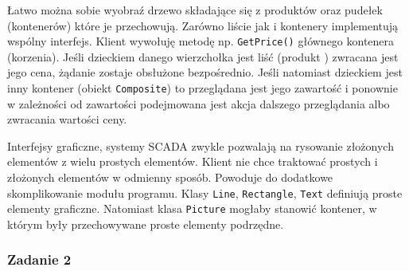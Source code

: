 Łatwo można sobie wyobraź drzewo składające się z produktów oraz pudełek (kontenerów) które je przechowują. Zarówno liście jak i kontenery implementują wspólny interfejs. Klient wywołuję metodę np. \texttt{GetPrice()} głównego kontenera (korzenia). Jeśli dzieckiem danego wierzchołka jest liść (produkt ) zwracana jest jego cena, żądanie zostaje obsłużone bezpośrednio. Jeśli natomiast dzieckiem jest inny kontener (obiekt \texttt{Composite}) to przeglądana jest jego zawartość i ponownie w zależności od zawartości podejmowana jest akcja dalszego przeglądania albo zwracania wartości ceny.

Interfejsy graficzne, systemy SCADA zwykle pozwalają na rysowanie złożonych elementów z wielu prostych elementów. Klient nie chce traktować prostych i złożonych elementów w odmienny sposób. Powoduje do dodatkowe skomplikowanie modułu programu. Klasy \texttt{Line}, \texttt{Rectangle}, \texttt{Text} definiują proste elementy graficzne. Natomiast klasa \texttt{Picture} mogłaby stanowić kontener, w którym były przechowywane proste elementy podrzędne.

\subsubsection{Zadanie 2}

